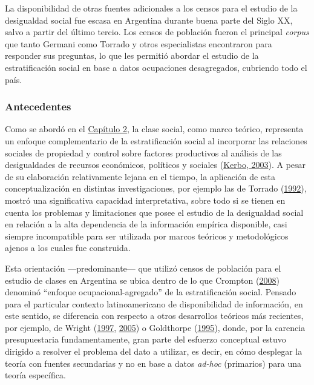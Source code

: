 \documentclass[
]{article}
\begin{document}
La disponibilidad de otras fuentes adicionales a los censos para el estudio de la desigualdad social fue escasa en Argentina durante buena parte del Siglo XX, salvo a partir del último tercio. Los censos de población fueron el principal \emph{corpus} que tanto Germani como Torrado y otros especialistas encontraron para responder sus preguntas, lo que les permitió abordar el estudio de la estratificación social en base a datos ocupaciones desagregados, cubriendo todo el país.

\hypertarget{antecedentes}{%
\subsubsection{Antecedentes}\label{antecedentes}}

Como se abordó en el \protect\hyperlink{analisis1}{Capítulo 2}, la clase social, como marco teórico, representa un enfoque complementario de la estratificación social al incorporar las relaciones sociales de propiedad y control sobre factores productivos al análisis de las desigualdades de recursos económicos, políticos y sociales (\protect\hyperlink{ref-Kerbo2003}{Kerbo, 2003}). A pesar de su elaboración relativamente lejana en el tiempo, la aplicación de esta conceptualización en distintas investigaciones, por ejemplo las de Torrado (\protect\hyperlink{ref-Torrado1992}{1992}), mostró una significativa capacidad interpretativa, sobre todo si se tienen en cuenta los problemas y limitaciones que posee el estudio de la desigualdad social en relación a la alta dependencia de la información empírica disponible, casi siempre incompatible para ser utilizada por marcos teóricos y metodológicos ajenos a los cuales fue construida.

Esta orientación ---predominante--- que utilizó censos de población para el estudio de clases en Argentina se ubica dentro de lo que Crompton (\protect\hyperlink{ref-Crompton2008}{2008}) denominó ``enfoque ocupacional-agregado'' de la estratificación social. Pensado para el particular contexto latinoamericano de disponibilidad de información, en este sentido, se diferencia con respecto a otros desarrollos teóricos más recientes, por ejemplo, de Wright (\protect\hyperlink{ref-Wright1997}{1997}, \protect\hyperlink{ref-Wright2005}{2005}) o Goldthorpe (\protect\hyperlink{ref-Goldthorpe1995}{1995}), donde, por la carencia presupuestaria fundamentamente, gran parte del esfuerzo conceptual estuvo dirigido a resolver el problema del dato a utilizar, es decir, en cómo desplegar la teoría con fuentes secundarias y no en base a datos \emph{ad-hoc} (primarios) para una teoría específica.
\end{document}
